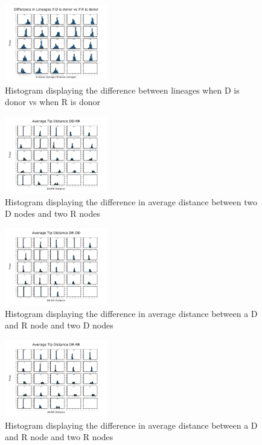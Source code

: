 \documentclass[final,5p,times,twocolumn,authoryear]{elsarticle}
\begin{document}
\begin{figure}
	\centering 
	\includegraphics[width=0.4\textwidth, angle=0]{sumstat3hist.pdf}	
	\caption{Histogram displaying the difference between lineages when D is donor vs when R is donor} 
	\label{fig_mom0}%
\end{figure}

\begin{figure}
	\centering 
	\includegraphics[width=0.4\textwidth, angle=0]{dd_rr_distance.pdf}	
	\caption{Histogram displaying the difference in average distance between two D nodes and two R nodes} 
	\label{fig_mom0}%
\end{figure}

\begin{figure}
	\centering 
	\includegraphics[width=0.4\textwidth, angle=0]{dr_dd_distance.pdf}	
	\caption{Histogram displaying the difference in average distance between a D and R node and two D nodes} 
	\label{fig_mom0}%
\end{figure}

\begin{figure}
	\centering 
	\includegraphics[width=0.4\textwidth, angle=0]{dr_rr_distance.pdf}	
	\caption{Histogram displaying the difference in average distance between a D and R node and two R nodes} 
	\label{fig_mom0}%
\end{figure}
\end{document}
